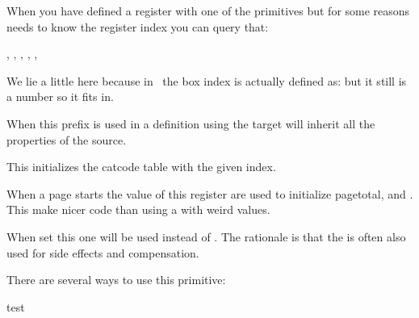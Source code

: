 When you have defined a register with one of the  primitives but for
some reasons needs to know the register index you can query that:

\startbuffer
\the\indexofregister \scratchcounterone,
\the\indexofregister \scratchcountertwo,
\the\indexofregister \scratchwidth,
\the\indexofregister \scratchheight,
\the\indexofregister \scratchdepth,
\the\indexofregister \scratchbox
\stopbuffer

\typebuffer


We lie a little here because in \CONTEXT\ the box index  is
actually defined as: \expanded {\typ {\meaningasis \scratchbox}} but it
still is a number so it fits in.

\getbuffer

\stopnewprimitive

\startnewprimitive[title={\prm {inherited}}]

When this prefix is used in a definition using  the target will inherit
all the properties of the source.

\stopnewprimitive

\startnewprimitive[title={\prm {initcatcodetable}}]

This initializes the catcode table with the given index.

\stopnewprimitive

\startnewprimitive[title={\prm {initialpageskip}}]

When a page starts the value of this register are used to initialize \prm
{pagetotal},  and . This make nicer code than
using a  with weird values.

\stopnewprimitive

\startnewprimitive[title={\prm {initialtopskip}}]

When set this one will be used instead of . The rationale is that
the  is often also used for side effects and compensation.

\stopnewprimitive

\startoldprimitive[title={\prm {input}}]

There are several ways to use this primitive:

\starttyping

 {test}


\stoptyping

